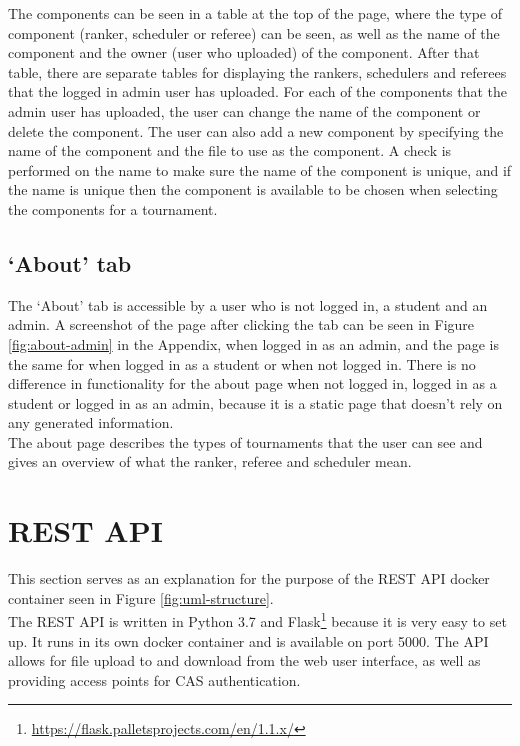 \documentclass[a4paper, 11pt]{report}
\begin{document}
The components can be seen in a table at the top of the page, where the type of
component (ranker, scheduler or referee) can be seen, as well as the name of the
component and the owner (user who uploaded) of the component. After that table,
there are separate tables for displaying the rankers, schedulers and referees
that the logged in admin user has uploaded. For each of the components that the
admin user has uploaded, the user can change the name of the component or delete
the component. The user can also add a new component by specifying the name of the
component and the file to use as the component. A check is performed on the name
to make sure the name of the component is unique, and if the name is unique then
the component is available to be chosen when selecting the components for a
tournament.

\subsection{`About' tab}
\label{sec:impl-tab-about}

The `About' tab is accessible by a user who is not logged in, a student
and an admin. A screenshot of the page after clicking the tab can be seen in
Figure \ref{fig:about-admin} in the Appendix, when logged in as an admin,
and the page is the same for when logged in as a student or when not logged in.
There is no difference in functionality for the about page when not logged in,
logged in as a student or logged in as an admin, because it is a static page
that doesn't rely on any generated information. \\

The about page describes the types of tournaments that the user can see and
gives an overview of what the ranker, referee and scheduler mean.

\section{REST API}

This section serves as an explanation for the purpose of the REST API docker
container seen in Figure \ref{fig:uml-structure}. \\

The REST API is written in Python 3.7 and Flask\footnote{\url{https://flask.palletsprojects.com/en/1.1.x/}}
because it is very easy to set up. It runs in its own docker container and is
available on port 5000. The API allows for file upload to and download from the
web user interface, as well as providing access points for CAS authentication. \\
\end{document}
